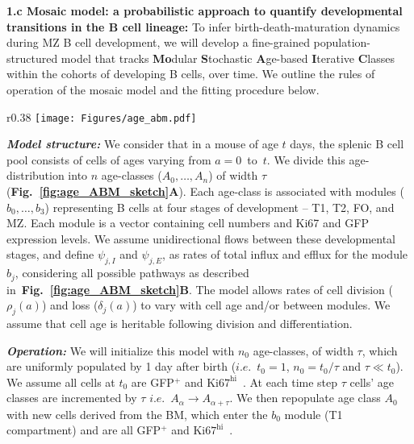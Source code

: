 \documentclass[11pt]{article}
\newcommand{\khi}{\ensuremath{\text{Ki67}^\text{hi}}~}
\newcommand\ie{$\textit{i.e.}$}
\begin{document}
\textbf{{1.c Mosaic model: a probabilistic approach to quantify developmental transitions in the B cell lineage:}}
To infer birth-death-maturation dynamics during MZ B cell development, we will develop a fine-grained population-structured model that tracks \textbf{Mo}dular \textbf{S}tochastic \textbf{A}ge-based \textbf{I}terative \textbf{C}lasses within the cohorts of developing B cells, over time.
We outline the rules of operation of the mosaic model and the fitting procedure below.

\begin{wrapfigure}{r}{0.38\textwidth}
\centering
\texttt{[image: Figures/age\_abm.pdf]}
\vspace*{-6mm}
\caption{\textbf{Schematics of the Mosaic model.} A cell's age is defined as the time since its ancestor left the bone marrow (BM).} %
\vspace*{-5mm}
\label{fig:age_ABM_sketch}
\end{wrapfigure}

\textbf{\textit{Model structure:}}
We consider that in a mouse of age $t$ days, the splenic B cell pool consists of cells of ages varying from $a=0$~to~$t$.
We divide this age-distribution into $n$ age-classes ($A_{0} ,\ldots, A_{n}$)  of width $\tau$ (\textbf{Fig.~\ref{fig:age_ABM_sketch}A}).
Each age-class is associated with modules ($b_{0} ,\ldots, b_{3}$) representing B cells at four stages of development -- T1, T2, FO, and MZ. Each module is a vector containing cell numbers and Ki67 and GFP expression levels. %
We assume unidirectional flows between these developmental stages, and define $\psi_{j, I}$ and $\psi_{j, E}$, as rates of total influx and efflux for the module $b_j$, considering all possible pathways as described in~\textbf{Fig.~\ref{fig:age_ABM_sketch}B}.
The model allows rates of cell division ($\rho_{j}(a)$) and loss ($\delta_{j}(a)$) to vary with cell age and/or between modules. 
We assume that cell age is heritable following division and differentiation.

\textbf{\textit{Operation:}}
We will initialize this model with $n_0$ age-classes, of width $\tau$, which are uniformly populated by 1 day after birth (\ie~$t_0=1$, $ n_0= t_\text{0}/{\tau}$ and $\tau \ll t_{0}$). We assume all cells at $t_{0}$ are GFP$^{+}$ and {\khi}.
At each time step $\tau$ cells' age classes are incremented by $\tau$ \ie~$A_\alpha \rightarrow A_{\alpha+\tau}$.
We then repopulate age class $A_0$ with new cells derived from the BM, which enter the $b_0$ module (T1 compartment) and are all GFP$^{+}$ and \khi.
\end{document}
